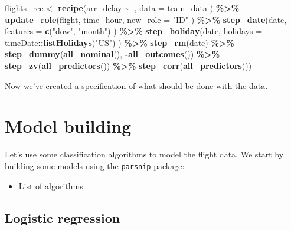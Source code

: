 \documentclass[
]{book}
\newenvironment{Shaded}{\begin{snugshade}}{\end{snugshade}}
\newcommand{\DataTypeTok}[1]{\textcolor[rgb]{0.13,0.29,0.53}{#1}}
\newcommand{\KeywordTok}[1]{\textcolor[rgb]{0.13,0.29,0.53}{\textbf{#1}}}
\newcommand{\NormalTok}[1]{#1}
\newcommand{\OperatorTok}[1]{\textcolor[rgb]{0.81,0.36,0.00}{\textbf{#1}}}
\newcommand{\StringTok}[1]{\textcolor[rgb]{0.31,0.60,0.02}{#1}}
\providecommand{\tightlist}{%
  \setlength{\itemsep}{0pt}\setlength{\parskip}{0pt}}
\begin{document}
\begin{Shaded}
\begin{Highlighting}[]
\NormalTok{flights\_rec \textless{}{-}}
\StringTok{  }\KeywordTok{recipe}\NormalTok{(arr\_delay }\OperatorTok{\textasciitilde{}}\StringTok{ }\NormalTok{.,}
    \DataTypeTok{data =}\NormalTok{ train\_data}
\NormalTok{  ) }\OperatorTok{\%\textgreater{}\%}
\StringTok{  }\KeywordTok{update\_role}\NormalTok{(flight,}
\NormalTok{    time\_hour,}
    \DataTypeTok{new\_role =} \StringTok{"ID"}
\NormalTok{  ) }\OperatorTok{\%\textgreater{}\%}
\StringTok{  }\KeywordTok{step\_date}\NormalTok{(date,}
    \DataTypeTok{features =} \KeywordTok{c}\NormalTok{(}\StringTok{"dow"}\NormalTok{, }\StringTok{"month"}\NormalTok{)}
\NormalTok{  ) }\OperatorTok{\%\textgreater{}\%}
\StringTok{  }\KeywordTok{step\_holiday}\NormalTok{(date,}
    \DataTypeTok{holidays =}\NormalTok{ timeDate}\OperatorTok{::}\KeywordTok{listHolidays}\NormalTok{(}\StringTok{"US"}\NormalTok{)}
\NormalTok{  ) }\OperatorTok{\%\textgreater{}\%}
\StringTok{  }\KeywordTok{step\_rm}\NormalTok{(date) }\OperatorTok{\%\textgreater{}\%}
\StringTok{  }\KeywordTok{step\_dummy}\NormalTok{(}\KeywordTok{all\_nominal}\NormalTok{(), }\OperatorTok{{-}}\KeywordTok{all\_outcomes}\NormalTok{()) }\OperatorTok{\%\textgreater{}\%}
\StringTok{  }\KeywordTok{step\_zv}\NormalTok{(}\KeywordTok{all\_predictors}\NormalTok{()) }\OperatorTok{\%\textgreater{}\%}
\StringTok{  }\KeywordTok{step\_corr}\NormalTok{(}\KeywordTok{all\_predictors}\NormalTok{())}
\end{Highlighting}
\end{Shaded}

Now we've created a specification of what should be done with the data.

\hypertarget{model-building-1}{%
\chapter{Model building}\label{model-building-1}}

Let's use some classification algorithms to model the flight data. We start by building some models using the \texttt{parsnip} package:

\begin{itemize}
\tightlist
\item
  \href{https://www.tidymodels.org/find/parsnip/}{List of algorithms}
\end{itemize}

\hypertarget{logistic-regression}{%
\section{Logistic regression}\label{logistic-regression}}
\end{document}
